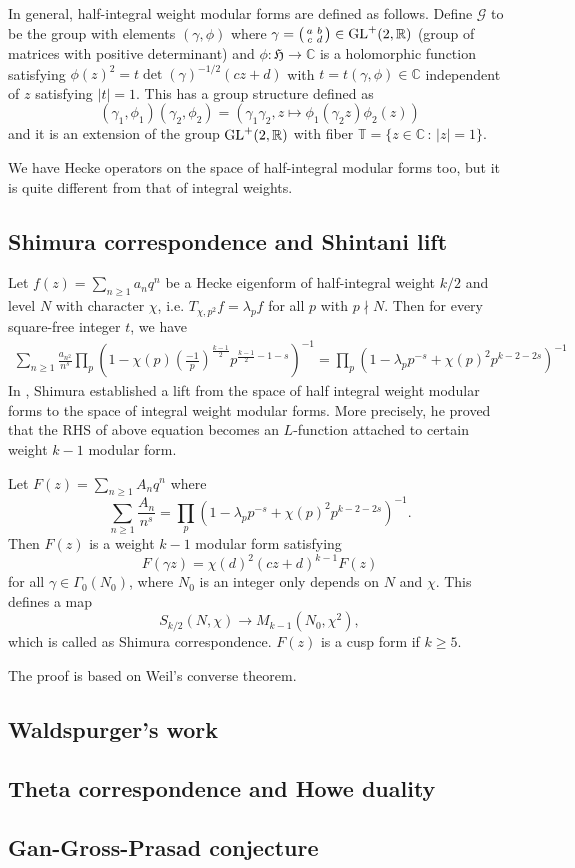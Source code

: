 In general, half-integral weight modular forms are defined as follows.
Define $\mathcal{G}$ to be the group with elements $(\gamma, \phi)$ where
$\gamma = \left(\begin{smallmatrix} a &b \\ c & d \end{smallmatrix}\right) \in \operatorname{\mathrm{GL}}^{+}(2, \mathbb{R})$ 
(group of matrices with positive determinant) and
$\phi: \mathfrak{H} \to \mathbb{C}$ is a holomorphic function satisfying
$\phi(z)^{2} = t\det(\gamma)^{-1/2}(cz+d)$ with $t = t(\gamma, \phi)\in \mathbb{C}$
independent of $z$ satisfying $|t| = 1$.
This has a group structure defined as
$$
(\gamma_{1}, \phi_{1})(\gamma_{2}, \phi_{2}) = (\gamma_{1}\gamma_{2}, z\mapsto \phi_{1}(\gamma_{2}z)\phi_{2}(z))
$$
and it is an extension of the group $\operatorname{\mathrm{GL}}^{+}(2, \mathbb{R})$ with fiber $\mathbb{T} = \{z\in\mathbb{C}\,:\,|z| = 1\}$.

We have Hecke operators on the space of half-integral modular forms too, but it is quite different from that of integral weights.



\subsection{Shimura correspondence and Shintani lift}
Let $f(z) = \sum_{n \geq 1} a_{n}q^{n}$ be a Hecke eigenform of half-integral weight $k/2$ and level $N$ with character $\chi$, i.e.
$T_{\chi, p^{2}}f = \lambda_{p}f$ for all $p$ with $p\nmid N$.
Then for every square-free integer $t$, we have
\begin{align*}
    \sum_{n\geq 1} \frac{a_{n^{2}}}{n^{s}} \prod_{p} \left(1 - \chi(p)\left(\frac{-1}{p}\right)^{\frac{k-1}{2}}p^{\frac{k-1}{2}-1-s}\right)^{-1} = \prod_{p} (1 - \lambda_{p} p^{-s} + \chi(p)^{2}p^{k-2-2s})^{-1}
\end{align*}
In \cite{shimura1973onmodular}, Shimura established a lift from the space of 
half integral weight modular forms to the space of integral weight modular forms.
More precisely, he proved that the RHS of above equation becomes an $L$-function attached to
certain weight $k-1$ modular form.
\begin{theorem}
Let $F(z) = \sum_{n\geq 1} A_{n}q^{n}$ where
$$
\sum_{n\geq 1} \frac{A_{n}}{n^{s}} = \prod_{p} (1 - \lambda_{p} p^{-s} + \chi(p)^{2}p^{k-2-2s})^{-1}.
$$
Then $F(z)$ is a weight $k-1$ modular form satisfying
$$
F(\gamma z) = \chi(d)^{2}(cz + d)^{k-1} F(z)
$$
for all $\gamma \in \Gamma_{0}(N_{0})$, where $N_{0}$ is an integer only depends on $N$ and $\chi$.
This defines a map
$$S_{k/2}(N, \chi) \to M_{k-1}(N_{0}, \chi^{2}),$$
which is called as Shimura correspondence.
$F(z)$ is a cusp form if $k\geq 5$.
\end{theorem}
The proof is based on Weil's converse theorem.

\subsection{Waldspurger's work}

\subsection{Theta correspondence and Howe duality}

\subsection{Gan-Gross-Prasad conjecture}